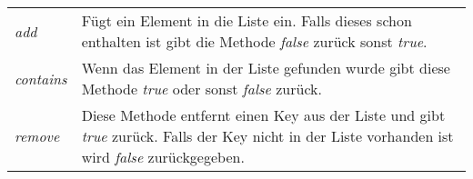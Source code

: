\documentclass[10pt,a4paper,titlepage,oneside]{article}
\begin{document}
\begin{table}[H]
    \begin{tabularx}{\textwidth}{lX}
        \textit{add} & Fügt ein Element in die Liste ein. Falls dieses schon enthalten ist gibt die Methode \textit{false} zurück sonst \textit{true}. \\
        \textit{contains} & Wenn das Element in der Liste gefunden wurde gibt diese Methode \textit{true} oder sonst \textit{false} zurück. \\
		\textit{remove} & Diese Methode entfernt einen Key aus der Liste und gibt \textit{true} zurück. Falls der Key nicht in der 
		Liste vorhanden ist wird \textit{false} zurückgegeben. \\
    \end{tabularx}
\end{table}




 
 




		
\end{document}
